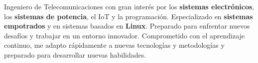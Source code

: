 \documentclass[10pt,a4paper,ragged2e,withhyper]{altacv}
\begin{document}


\makecvheader



Ingeniero de Telecomunicaciones con gran interés por los \textbf{sistemas electrónicos}, los \textbf{sistemas de potencia}, el IoT y la programación. Especializado en \textbf{sistemas empotrados} y en sistemas basados en \textbf{Linux}. Preparado para enfrentar nuevos desafíos y trabajar en un entorno innovador. Comprometido con el aprendizaje continuo, me adapto rápidamente a nuevas tecnologías y metodologías y preparado para desarrollar nuevas habilidades.
\end{document}
